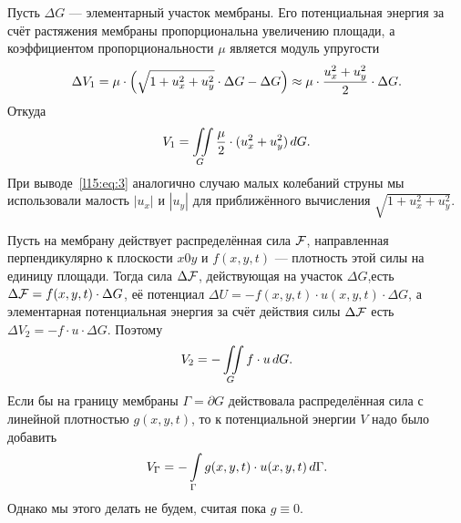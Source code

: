Пусть $\Delta G$ --- элементарный участок мембраны. Его потенциальная энергия за счёт растяжения мембраны пропорциональна увеличению площади, а коэффициентом пропорциональности $\mu$ является модуль упругости
\begin{equation*}
	\hfill\Delta V_1=\mu\cdot\left(\sqrt{1+u_x^2+u_y^2}\cdot\Delta G-\Delta G\right)\approx\mu\cdot\frac{u_x^2+u_y^2}{2}\cdot\Delta G.\hfill
\end{equation*}
Откуда
\begin{equation}\label{l15:eq:3}
	\hfill V_1=\iint\limits_{G}\frac{\mu}{2}\cdot(u_x^2+u_y^2)\,dG.\hfill
\end{equation}
При выводе~\eqref{l15:eq:3} аналогично случаю малых колебаний струны мы использовали малость $|u_x|$ и $|u_y|$ для приближённого вычисления $\sqrt{1+u_x^2+u_y^2}$.

Пусть на мембрану действует распределённая сила $\mathcal{F}$, направленная перпендикулярно к плоскости $x0y$ и $f(x,y,t)$ --- плотность этой силы на единицу площади. Тогда сила $\Delta\mathcal{F}$, действующая на участок $\Delta G$,есть $\Delta\mathcal{F}=f(x,y,t)\cdot\Delta G$, её потенциал $\Delta U=-f(x,y,t)\cdot u(x,y,t)\cdot\Delta G$, а элементарная потенциальная энергия за счёт действия силы $\Delta \mathcal{F}$ есть $\Delta V_{2}=-f\cdot u\cdot\Delta G$. Поэтому 
\begin{equation}\label{l15:eq:4}
	\hfill V_{2}=-\iint\limits_{G}f\cdot u\,dG.\hfill
\end{equation}
Если бы на границу мембраны $\Gamma=\partial G$ действовала распределённая сила с линейной плотностью $g(x,y,t)$, то к потенциальной энергии $V$ надо было добавить
\begin{equation}\label{l15:eq:5}
	\hfill V_{\Gamma}=-\int\limits_{\Gamma}g(x,y,t)\cdot u(x,y,t)\,d\Gamma.\hfill
\end{equation}  
Однако мы этого делать не будем, считая пока $g\equiv0$.

